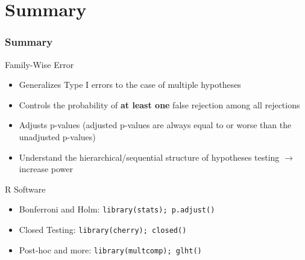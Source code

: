 \documentclass[xcolor={dvipsnames}]{beamer}
\newcommand{\bb}[1]{\begin{block}{#1}}
\newcommand{\eb}{\end{block}}
\newcommand{\bi}{\begin {itemize}}
\newcommand{\ei}{\end{itemize}}
\newcommand{\bfr}[1]{\begin{frame} \frametitle{#1}}
\begin{document}
\section{Summary}
\bfr{Summary}
\bb{Family-Wise Error}
\bi
\item Generalizes Type I errors to the case of multiple hypotheses
\pause
\item Controls the probability of \textbf{at least one} false rejection among all rejections
\pause
\item Adjusts p-values (adjusted p-values are always equal to or worse than the unadjusted p-values)
\pause
\item Understand the hierarchical/sequential structure of hypotheses testing $\rightarrow$ increase power
\ei
\eb
\pause
\bb{R Software}
\bi
\item Bonferroni and Holm: {\tt library(stats); p.adjust()}
\item Closed Testing: {\tt library(cherry); closed()}
\item Post-hoc and more: {\tt library(multcomp); glht()}
\ei
\eb
\end{frame}
\end{document}
